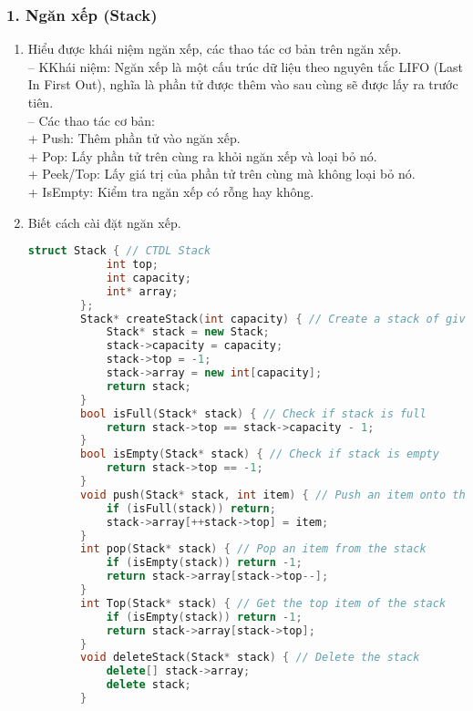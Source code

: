 \subsubsection*{1. Ngăn xếp (Stack)}
\begin{enumerate}[label=\alph*.]
    \item Hiểu được khái niệm ngăn xếp, các thao tác cơ bản trên ngăn xếp.\\
    -- KKhái niệm: Ngăn xếp là một cấu trúc dữ liệu theo nguyên tắc LIFO (Last In First Out), nghĩa là phần tử được thêm vào sau cùng sẽ được lấy ra trước tiên.\\
    -- Các thao tác cơ bản:\\
        + Push: Thêm phần tử vào ngăn xếp.\\
        + Pop: Lấy phần tử trên cùng ra khỏi ngăn xếp và loại bỏ nó.\\
        + Peek/Top: Lấy giá trị của phần tử trên cùng mà không loại bỏ nó.\\
        + IsEmpty: Kiểm tra ngăn xếp có rỗng hay không.
    \item Biết cách cài đặt ngăn xếp.
    \begin{lstlisting}[language=C++]
        struct Stack { // CTDL Stack
            int top;
            int capacity;
            int* array;
        };
        Stack* createStack(int capacity) { // Create a stack of given capacity
            Stack* stack = new Stack;
            stack->capacity = capacity;
            stack->top = -1;
            stack->array = new int[capacity];
            return stack;
        }
        bool isFull(Stack* stack) { // Check if stack is full
            return stack->top == stack->capacity - 1;
        }
        bool isEmpty(Stack* stack) { // Check if stack is empty
            return stack->top == -1;
        }
        void push(Stack* stack, int item) { // Push an item onto the stack
            if (isFull(stack)) return;
            stack->array[++stack->top] = item;
        }
        int pop(Stack* stack) { // Pop an item from the stack
            if (isEmpty(stack)) return -1; 
            return stack->array[stack->top--];
        }
        int Top(Stack* stack) { // Get the top item of the stack
            if (isEmpty(stack)) return -1; 
            return stack->array[stack->top];
        }
        void deleteStack(Stack* stack) { // Delete the stack
            delete[] stack->array;
            delete stack;
        }
    \end{lstlisting}
\end{enumerate}
\vspace{-6em}
